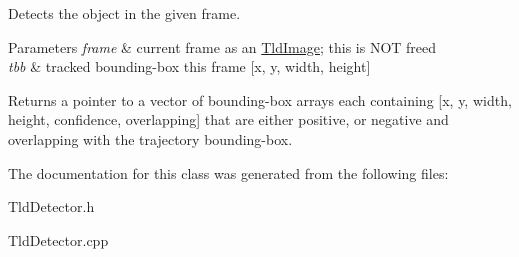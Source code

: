 \-Detects the object in the given frame. 


\begin{DoxyParams}{\-Parameters}
{\em frame} & current frame as an \hyperlink{class_tld_image}{\-Tld\-Image}; this is \-N\-O\-T freed \\
\hline
{\em tbb} & tracked bounding-\/box this frame \mbox{[}x, y, width, height\mbox{]} \\
\hline
\end{DoxyParams}
\begin{DoxyReturn}{\-Returns}
a pointer to a vector of bounding-\/box arrays each containing \mbox{[}x, y, width, height, confidence, overlapping\mbox{]} that are either positive, or negative and overlapping with the trajectory bounding-\/box. 
\end{DoxyReturn}


\-The documentation for this class was generated from the following files\-:\begin{DoxyCompactItemize}
\item 
\-Tld\-Detector.\-h\item 
\-Tld\-Detector.\-cpp\end{DoxyCompactItemize}
